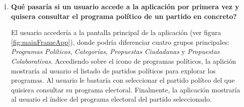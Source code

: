 \begin{enumerate}[label=\textbf{\Alph*}]

 \item \textbf{Qué pasaría si un usuario accede a la aplicación por primera vez y quisera consultar el programa político de un partido en concreto?}
 
 El usuario accedería a la pantalla principal de la aplicación (ver figura \ref{fig:mainFrameApp}), donde podría diferenciar cuatro grupos principales: \textit{Programas Políticos}, \textit{Categorías}, \textit{Propuestas Ciudadanas} y \textit{Propuestas Colaborativas}. Accediendo sobre el icono de programas políticos, la aplición mostraría al usuario el listado de partidos políticos para explorar los programas. Al usuario le bastaría con seleccionar el partido polítco del que quisiera consultar su programa electoral. Finalmente, la aplicación mostraría al usuario el índice del programa electoral del partido seleccionado. 
 

\end{enumerate}
